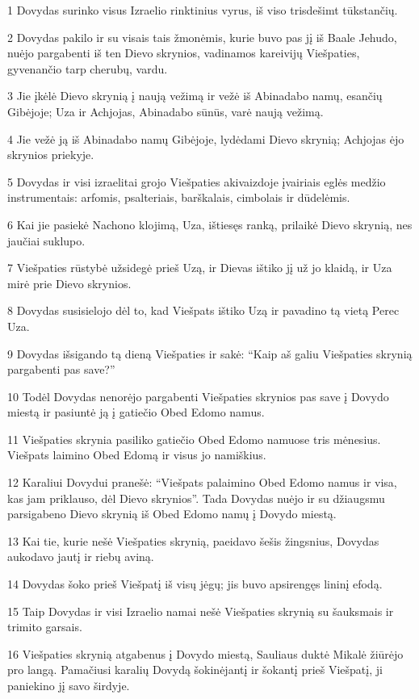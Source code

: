 \par 1 Dovydas surinko visus Izraelio rinktinius vyrus, iš viso trisdešimt tūkstančių. 
\par 2 Dovydas pakilo ir su visais tais žmonėmis, kurie buvo pas jį iš Baale Jehudo, nuėjo pargabenti iš ten Dievo skrynios, vadinamos kareivijų Viešpaties, gyvenančio tarp cherubų, vardu. 
\par 3 Jie įkėlė Dievo skrynią į naują vežimą ir vežė iš Abinadabo namų, esančių Gibėjoje; Uza ir Achjojas, Abinadabo sūnūs, varė naują vežimą. 
\par 4 Jie vežė ją iš Abinadabo namų Gibėjoje, lydėdami Dievo skrynią; Achjojas ėjo skrynios priekyje. 
\par 5 Dovydas ir visi izraelitai grojo Viešpaties akivaizdoje įvairiais eglės medžio instrumentais: arfomis, psalteriais, barškalais, cimbolais ir dūdelėmis. 
\par 6 Kai jie pasiekė Nachono klojimą, Uza, ištiesęs ranką, prilaikė Dievo skrynią, nes jaučiai suklupo. 
\par 7 Viešpaties rūstybė užsidegė prieš Uzą, ir Dievas ištiko jį už jo klaidą, ir Uza mirė prie Dievo skrynios. 
\par 8 Dovydas susisielojo dėl to, kad Viešpats ištiko Uzą ir pavadino tą vietą Perec Uza. 
\par 9 Dovydas išsigando tą dieną Viešpaties ir sakė: “Kaip aš galiu Viešpaties skrynią pargabenti pas save?” 
\par 10 Todėl Dovydas nenorėjo pargabenti Viešpaties skrynios pas save į Dovydo miestą ir pasiuntė ją į gatiečio Obed Edomo namus. 
\par 11 Viešpaties skrynia pasiliko gatiečio Obed Edomo namuose tris mėnesius. Viešpats laimino Obed Edomą ir visus jo namiškius. 
\par 12 Karaliui Dovydui pranešė: “Viešpats palaimino Obed Edomo namus ir visa, kas jam priklauso, dėl Dievo skrynios”. Tada Dovydas nuėjo ir su džiaugsmu parsigabeno Dievo skrynią iš Obed Edomo namų į Dovydo miestą. 
\par 13 Kai tie, kurie nešė Viešpaties skrynią, paeidavo šešis žingsnius, Dovydas aukodavo jautį ir riebų aviną. 
\par 14 Dovydas šoko prieš Viešpatį iš visų jėgų; jis buvo apsirengęs lininį efodą. 
\par 15 Taip Dovydas ir visi Izraelio namai nešė Viešpaties skrynią su šauksmais ir trimito garsais. 
\par 16 Viešpaties skrynią atgabenus į Dovydo miestą, Sauliaus duktė Mikalė žiūrėjo pro langą. Pamačiusi karalių Dovydą šokinėjantį ir šokantį prieš Viešpatį, ji paniekino jį savo širdyje. 
